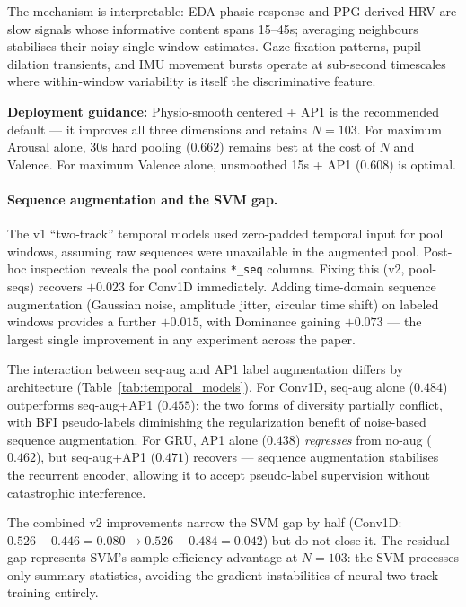 \documentclass[sigconf,review,anonymous]{acmart}
\begin{document}
The mechanism is interpretable: EDA phasic response and PPG-derived HRV are
slow signals whose informative content spans 15--45s; averaging neighbours
stabilises their noisy single-window estimates.
Gaze fixation patterns, pupil dilation transients, and IMU movement bursts
operate at sub-second timescales where within-window variability is itself
the discriminative feature.

\textbf{Deployment guidance:} Physio-smooth centered + AP1 is the recommended
default --- it improves all three dimensions and retains $N{=}103$.
For maximum Arousal alone, 30s hard pooling ($0.662$) remains best at the cost
of $N$ and Valence.
For maximum Valence alone, unsmoothed 15s + AP1 ($0.608$) is optimal.

\paragraph{Sequence augmentation and the SVM gap.}
The v1 ``two-track'' temporal models used zero-padded temporal input for pool
windows, assuming raw sequences were unavailable in the augmented pool.
Post-hoc inspection reveals the pool contains \texttt{*\_seq} columns.
Fixing this (v2, pool-seqs) recovers $+0.023$ for Conv1D immediately.
Adding time-domain sequence augmentation (Gaussian noise, amplitude jitter,
circular time shift) on labeled windows provides a further $+0.015$, with
Dominance gaining $+0.073$ --- the largest single improvement in any
experiment across the paper.

The interaction between seq-aug and AP1 label augmentation differs by
architecture (Table~\ref{tab:temporal_models}).
For Conv1D, seq-aug alone ($0.484$) outperforms seq-aug+AP1 ($0.455$):
the two forms of diversity partially conflict, with BFI pseudo-labels
diminishing the regularization benefit of noise-based sequence augmentation.
For GRU, AP1 alone ($0.438$) \emph{regresses} from no-aug ($0.462$), but
seq-aug+AP1 ($0.471$) recovers --- sequence augmentation stabilises the
recurrent encoder, allowing it to accept pseudo-label supervision without
catastrophic interference.

The combined v2 improvements narrow the SVM gap by half
(Conv1D: $0.526{-}0.446{=}0.080 \rightarrow 0.526{-}0.484{=}0.042$)
but do not close it.
The residual gap represents SVM's sample efficiency advantage at $N{=}103$:
the SVM processes only summary statistics, avoiding the gradient instabilities
of neural two-track training entirely.
\end{document}
